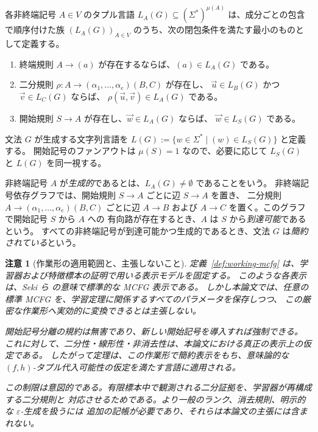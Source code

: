 \documentclass[11pt,a4paper]{ltjsarticle}
\newtheorem{remark}[theorem]{注意}
\theoremstyle{remark}
\newcommand{\tuple}[1]{\vec{#1}}
\newcommand{\eps}{\varepsilon}
\begin{document}
各非終端記号 \(A\in V\) のタプル言語
\(L_A(G)\subseteq(\Sigma^*)^{\mu(A)}\) は、成分ごとの包含で順序付けた族
\((L_A(G))_{A\in V}\) のうち、次の閉包条件を満たす最小のものとして定義する。
\begin{enumerate}[label=(\roman*),leftmargin=*]
\item 終端規則 \(A\to(a)\) が存在するならば、\((a)\in L_A(G)\) である。

\item 二分規則 \(\rho\colon A\to(\alpha_1,\ldots,\alpha_e)(B,C)\) が存在し、
      \(\tuple u\in L_B(G)\) かつ \(\tuple v\in L_C(G)\) ならば、
      \(\rho(\tuple u,\tuple v)\in L_A(G)\) である。

\item 開始規則 \(S\to A\) が存在し、\(\tuple w\in L_A(G)\) ならば、
      \(\tuple w\in L_S(G)\) である。
\end{enumerate}
文法 \(G\) が生成する文字列言語を
\(L(G):=\{w\in\Sigma^*\mid (w)\in L_S(G)\}\) と定義する。
開始記号のファンアウトは \(\mu(S)=1\) なので、必要に応じて \(L_S(G)\) と \(L(G)\) を同一視する。

非終端記号 \(A\) が\emph{生成的}であるとは、\(L_A(G)\ne\emptyset\) であることをいう。
非終端記号依存グラフでは、開始規則 \(S\to A\) ごとに辺 \(S\to A\) を置き、
二分規則 \(A\to(\alpha_1,\ldots,\alpha_e)(B,C)\) ごとに辺
\(A\to B\) および \(A\to C\) を置く。このグラフで開始記号 \(S\) から \(A\) への
有向路が存在するとき、\(A\) は \(S\) から\emph{到達可能}であるという。
すべての非終端記号が到達可能かつ生成的であるとき、文法 \(G\) は\emph{簡約されている}という。

\begin{remark}[作業形の適用範囲と、主張しないこと]
\label{rem:working-form-scope}
定義~\ref{def:working-mcfg} は、学習器および特徴標本の証明で用いる表示モデルを固定する。
このような各表示は、Seki ら \cite{SekiEtAl1991} の意味で標準的な MCFG 表示である。
しかし本論文では、任意の標準 MCFG を、学習定理に関係するすべてのパラメータを保存しつつ、
この厳密な作業形へ実効的に変換できるとは主張しない。

開始記号分離の規約は無害であり、新しい開始記号を導入すれば強制できる。
これに対して、二分性・線形性・非消去性は、本論文における真正の表示上の仮定である。
したがって定理は、この作業形で簡約表示をもち、意味論的な
\((f,h)\)-タプル代入可能性の仮定を満たす言語に適用される。

この制限は意図的である。有限標本中で観測される二分証拠を、学習器が再構成する二分規則と
対応させるためである。より一般のランク、消去規則、明示的な \(\eps\)-生成を扱うには
追加の記帳が必要であり、それらは本論文の主張には含まれない。
\end{remark}
\end{document}
